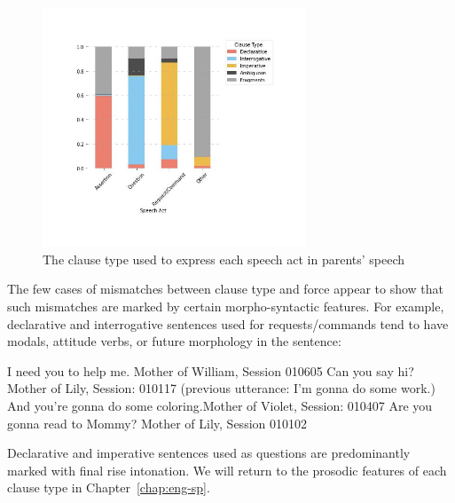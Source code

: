 \begin{figure}[H]
    \centering
    \includegraphics[width=0.7\textwidth]{figures/real-spcl.jpg}
    \caption{The clause type used to express each speech act in parents' speech}
    \label{fig:real-spcl}
\end{figure}


The few cases of mismatches between clause type and force appear to show that such mismatches are marked by certain morpho-syntactic features. For example, declarative and interrogative sentences used for requests/commands tend to have modals, attitude verbs, or future morphology in the sentence:

\bxl{}	I need you to help me.		\hfill	Mother of William, Session 010605
\ex	Can you say hi?				\hfill	Mother of Lily, Session: 010117
\ex	(previous utterance: I'm gonna do some work.)\\
And you’re gonna do some coloring.\hfill		Mother of Violet, Session: 010407
\ex  Are you gonna read to Mommy?	\hfill	Mother of Lily, Session 010102
\exl
\eex 

Declarative and imperative sentences used as questions are predominantly marked with final rise intonation. We will return to the prosodic features of each clause type in Chapter~\ref{chap:eng-sp}.

